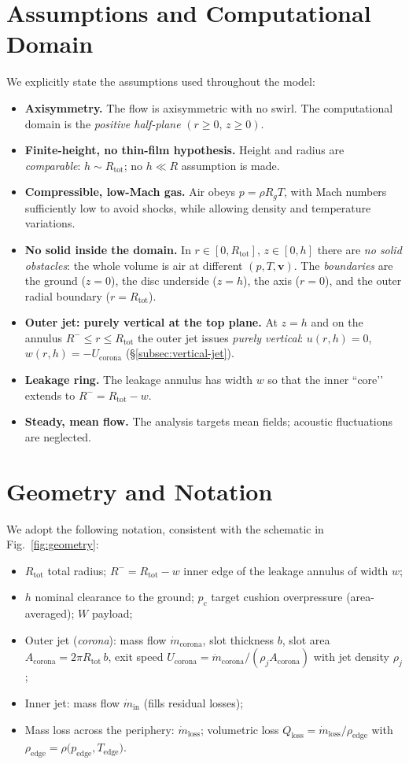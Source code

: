 \documentclass[11pt,a4paper]{article}
\begin{document}
\section{Assumptions and Computational Domain}
We explicitly state the assumptions used throughout the model:
\begin{itemize}
  \item \textbf{Axisymmetry.} The flow is axisymmetric with no swirl. The computational domain is the \emph{positive half-plane} $(r\ge 0,\, z\ge 0)$.
  \item \textbf{Finite-height, no thin-film hypothesis.} Height and radius are \emph{comparable}: $h \sim R_{\text{tot}}$; no $h\ll R$ assumption is made.
  \item \textbf{Compressible, low-Mach gas.} Air obeys $p=\rho R_g T$, with Mach numbers sufficiently low to avoid shocks, while allowing density and temperature variations.
  \item \textbf{No solid inside the domain.} In $r\in[0,R_{\text{tot}}]$, $z\in[0,h]$ there are \emph{no solid obstacles}: the whole volume is air at different $(p,T,\mathbf{v})$. The \emph{boundaries} are the ground ($z=0$), the disc underside ($z=h$), the axis ($r=0$), and the outer radial boundary ($r=R_{\text{tot}}$).
  \item \textbf{Outer jet: purely vertical at the top plane.} At $z=h$ and on the annulus $R^-\le r\le R_{\text{tot}}$ the outer jet issues \emph{purely vertical}: $u(r,h)=0$, $w(r,h)=-U_{\mathrm{corona}}$ (\S\ref{subsec:vertical-jet}).
  \item \textbf{Leakage ring.} The leakage annulus has width $w$ so that the inner “core’’ extends to $R^-=R_{\text{tot}}-w$.
  \item \textbf{Steady, mean flow.} The analysis targets mean fields; acoustic fluctuations are neglected.
\end{itemize}

\section{Geometry and Notation}
We adopt the following notation, consistent with the schematic in Fig.~\ref{fig:geometry}:
\begin{itemize}
  \item $R_{\text{tot}}$ total radius; $R^-=R_{\text{tot}}-w$ inner edge of the leakage annulus of width $w$;
  \item $h$ nominal clearance to the ground; $p_c$ target cushion overpressure (area-averaged); $W$ payload;
  \item Outer jet (\textit{corona}): mass flow $\dot m_{\mathrm{corona}}$, slot thickness $b$, slot area $A_{\mathrm{corona}}=2\pi R_{\text{tot}}\,b$, exit speed $U_{\mathrm{corona}}=\dot m_{\mathrm{corona}}/(\rho_j A_{\mathrm{corona}})$ with jet density $\rho_j$;
  \item Inner jet: mass flow $\dot m_{\mathrm{in}}$ (fills residual losses);
  \item Mass loss across the periphery: $\dot m_{\mathrm{loss}}$; volumetric loss $Q_{\mathrm{loss}}=\dot m_{\mathrm{loss}}/\rho_\mathrm{edge}$ with $\rho_\mathrm{edge}=\rho\!\big(p_\mathrm{edge},T_\mathrm{edge}\big)$.
\end{itemize}
\end{document}

